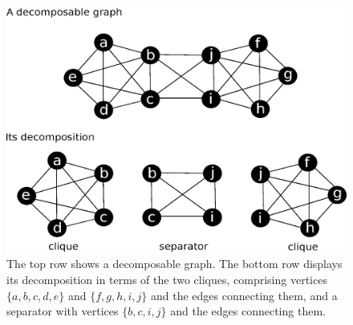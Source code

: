 \begin{figure}[h!]
\begin{center}
\includegraphics[angle=0, scale=0.45]{DecomposableGraph.eps}
\end{center}
\caption{The top row shows a decomposable graph. The bottom row displays its decomposition in terms of the two cliques, comprising vertices $\{a, b, c, d, e\}$ and $\{f, g, h, i, j\}$ and the edges connecting them, and a separator with vertices $\{b, c, i, j\}$ and the edges connecting them.
\label{fig.decomposableGraphIllustration}}
\end{figure}

